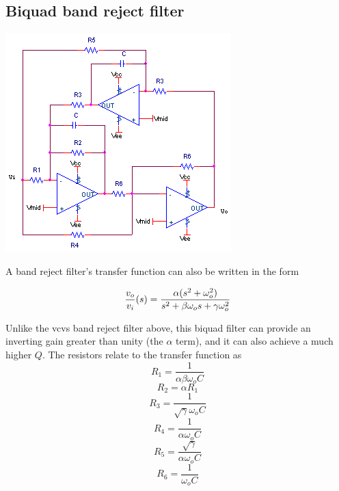 \subsection{Biquad band reject filter}
\begin{center}
	\includegraphics{schematics/biquad_bandreject.PNG}
\end{center}
A band reject filter's transfer function can also be written in the form 

\textcolor{red}{
\begin{equation}
\frac{\vout}{\vin}(s) = \frac{\alpha (s^2 + \omega_{o}^2)}{s^2 + \beta \omega_{o}s + \gamma \omega_{o}^2}
\label{eq:biquad_bandreject}
\end{equation}
}

Unlike the \ac{vcvs} band reject filter above, this biquad filter can provide an inverting gain greater than unity (the $\alpha$ term), and it can also achieve a much higher $Q$.
The resistors relate to the transfer function as \autocite[146-148]{op-amp-circuits-johnson}
\begin{equation}
R_1 = \frac{1}{\alpha \beta \omega_{o}C}
\end{equation}
\begin{equation}
R_2 = \alpha R_1
\end{equation}
\begin{equation}
R_3 = \frac{1}{\sqrt{\gamma} \omega_{o}C}
\end{equation}
\begin{equation}
R_4 = \frac{1}{\alpha \omega_{o}C}
\end{equation}
\begin{equation}
R_5 = \frac{\sqrt{\gamma}}{\alpha \omega_{o}C}
\end{equation}
\begin{equation}
R_6 = \frac{1}{\omega_{o}C}
\end{equation}

